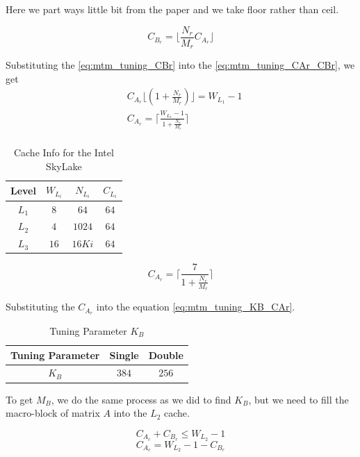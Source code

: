 Here we part ways little bit from the paper and we take floor rather than ceil.

\begin{equation}
    C_{B_r} = \lfloor \frac{N_r}{M_r} C_{A_r} \rfloor
    \label{eq:mtm_tuning_CBr}
\end{equation}

Substituting the \ref{eq:mtm_tuning_CBr} into the \ref{eq:mtm_tuning_CAr_CBr}, we get
\begin{align*}
    &C_{A_r} \lfloor ( 1 + \frac{N_r}{M_r} ) \rfloor = W_{L_1} - 1\\
    &C_{A_r} = \lceil \frac{W_{L_1} - 1}{1 + \frac{N_r}{M_r}} \rceil\\
\end{align*}

\begin{table}[ht]
    \centering
    \caption{Cache Info for the Intel SkyLake}
    \begin{tabular}{|c|c|c|c|}
        \hline
        \textbf{Level} & \textbf{$W_{L_i}$} & \textbf{$N_{L_i}$} & \textbf{$C_{L_i}$}\\
        \hline
        $L_1$   & $8$ & $64$ & $64$ \\
        \hline
        $L_2$   & $4$ & $1024$ & $64$ \\
        \hline
        $L_3$   & $16$ & $16Ki$ & $64$ \\
        \hline
    \end{tabular}
\end{table}

\[
    C_{A_r} = \lceil \frac{7}{1 + \frac{N_r}{M_r}} \rceil
\]

Substituting the $C_{A_r}$ into the equation \ref{eq:mtm_tuning_KB_CAr}.

\begin{table}[ht]
    \centering
    \caption{Tuning Parameter $K_B$}
    \begin{tabular}{|c|c|c|}
        \hline
        \textbf{Tuning Parameter} & \textbf{Single} & \textbf{Double}\\
        \hline
        $K_B$   & $384$ & $256$ \\
        \hline
    \end{tabular}
\end{table}

To get $M_B$, we do the same process as we did to find $K_B$, but we need to fill 
the macro-block of matrix $A$ into the $L_2$ cache.

\[C_{A_c} + C_{B_r} \leq W_{L_2} - 1\]
\[C_{A_c} = W_{L_2} - 1 - C_{B_r}\]


